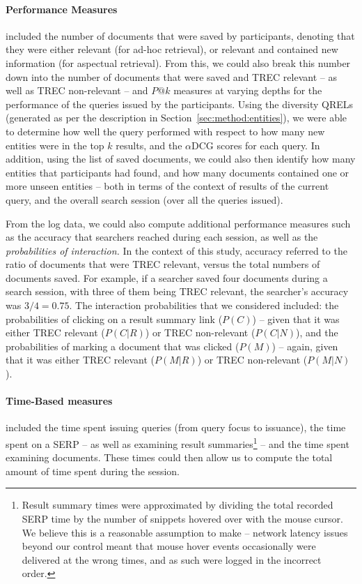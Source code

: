 \paragraph{Performance Measures} included the number of documents that were saved by participants, denoting that they were either relevant (for ad-hoc retrieval), or relevant and contained new information (for aspectual retrieval). From this, we could also break this number down into the number of documents that were saved and TREC relevant -- as well as TREC non-relevant -- and $P@k$ measures at varying depths for the performance of the queries issued by the participants. Using the diversity QRELs (generated as per the description in Section~\ref{sec:method:entities}), we were able to determine how well the query performed with respect to how many new entities were in the top $k$ results, and the $\alpha$DCG scores for each query. In addition, using the list of saved documents, we could also then identify how many entities that participants had found, and how many documents contained one or more unseen entities -- both in terms of the context of results of the current query, and the overall search session (over all the queries issued).

From the log data, we could also compute additional performance measures such as the accuracy that searchers reached during each session, as well as the \emph{probabilities of interaction.} In the context of this study, accuracy referred to the ratio of documents that were TREC relevant, versus the total numbers of documents saved. For example, if a searcher saved four documents during a search session, with three of them being TREC relevant, the searcher's accuracy was $3/4 = 0.75$. The interaction probabilities that we considered included: the probabilities of clicking on a result summary link ($P(C)$) -- given that it was either TREC relevant ($P(C|R)$) or TREC non-relevant ($P(C|N)$), and the probabilities of marking a document that was clicked ($P(M)$) -- again, given that it was either TREC relevant ($P(M|R)$) or TREC non-relevant ($P(M|N)$).

\paragraph{Time-Based measures} included the time spent issuing queries (from query focus to issuance), the time spent on a SERP -- as well as examining result summaries\footnote{Result summary times were approximated by dividing the total recorded SERP time by the number of snippets hovered over with the mouse cursor. We believe this is a reasonable assumption to make -- network latency issues beyond our control meant that mouse hover events occasionally were delivered at the wrong times, and as such were logged in the incorrect order.} -- and the time spent examining documents. These times could then allow us to compute the total amount of time spent during the session.

